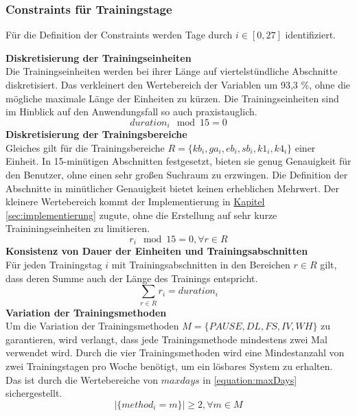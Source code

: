 \subsubsection{Constraints für Trainingstage}
Für die Definition der Constraints werden Tage durch $i \in [0, 27]$ identifiziert. \par
\textbf{Diskretisierung der Trainingseinheiten} \\[0.2em]
Die Trainingseinheiten werden bei ihrer Länge auf viertelstündliche Abschnitte diskretisiert. Das verkleinert den Wertebereich der Variablen um 93,3 \%, ohne die mögliche maximale Länge der Einheiten zu kürzen. Die Trainingseinheiten sind im Hinblick auf den Anwendungsfall so auch praxistauglich.
\begin{equation}
    {duration}_i \mod 15 = 0
\end{equation} 
\textbf{Diskretisierung der Trainingsbereiche} \\[0.2em]
Gleiches gilt für die Trainingsbereiche $R = \{kb_i, ga_i, eb_i, sb_i, k1_i, k4_i\}$ einer Einheit. In 15-minütigen Abschnitten festgesetzt, bieten sie genug Genauigkeit für den Benutzer, ohne einen sehr großen Suchraum zu erzwingen. Die Definition der Abschnitte in minütlicher Genauigkeit bietet keinen erheblichen Mehrwert. Der kleinere Wertebereich kommt der Implementierung in \hyperref[sec:implementierung]{Kapitel \ref{sec:implementierung}} zugute, ohne die Erstellung auf sehr kurze Traininingseinheiten zu limitieren.
\begin{equation}
    r_i \mod 15 = 0, \forall r \in R
\end{equation}
\textbf{Konsistenz von Dauer der Einheiten und Trainingsabschnitten} \\[0.2em]
Für jeden Trainingstag $i$ mit Trainingsabschnitten in den Bereichen $r \in R$ gilt, dass deren Summe auch der Länge des Trainings entspricht.
\begin{equation}
    \sum_{r\in R} r_i = duration_i
\end{equation}
\textbf{Variation der Trainingsmethoden} \\[0.2em]
Um die Variation der Trainingsmethoden $M = \{PAUSE, DL, FS, IV, WH\}$ zu garantieren, wird verlangt, dass jede Trainingsmethode mindestens zwei Mal verwendet wird. Durch die vier Trainingsmethoden wird eine Mindestanzahl von zwei Trainingstagen pro Woche benötigt, um ein lösbares System zu erhalten. Das ist durch die Wertebereiche von $maxdays$ in \ref{equation:maxDays} sichergestellt.
\begin{equation} 
    |\{method_i = m\}| \geq 2, \forall m \in M
\end{equation} 
